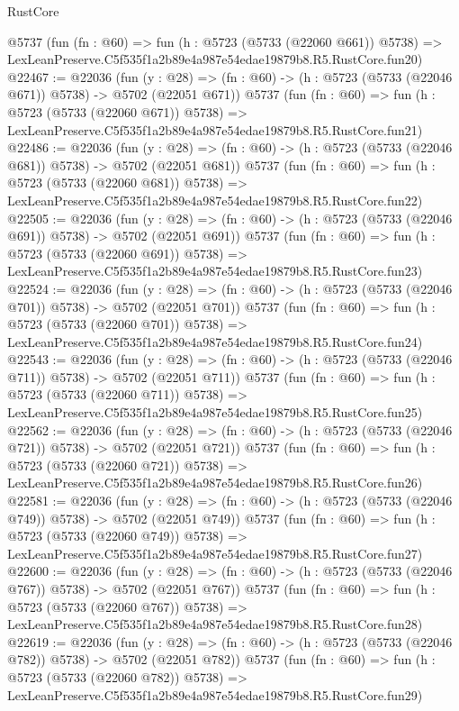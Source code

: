 \begin{lexlean}{RustCore}
\begin{coremodule}
    @5737
    (fun (fn : @60) =>
    fun (h : @5723 (@5733 (@22060 @661)) @5738) =>
    LexLeanPreserve.C5f535f1a2b89e4a987e54edae19879b8.R5.RustCore.fun20)
@22467 := @22036
    (fun (y : @28) => (fn : @60) -> (h : @5723 (@5733 (@22046 @671)) @5738) -> @5702 (@22051 @671))
    @5737
    (fun (fn : @60) =>
    fun (h : @5723 (@5733 (@22060 @671)) @5738) =>
    LexLeanPreserve.C5f535f1a2b89e4a987e54edae19879b8.R5.RustCore.fun21)
@22486 := @22036
    (fun (y : @28) => (fn : @60) -> (h : @5723 (@5733 (@22046 @681)) @5738) -> @5702 (@22051 @681))
    @5737
    (fun (fn : @60) =>
    fun (h : @5723 (@5733 (@22060 @681)) @5738) =>
    LexLeanPreserve.C5f535f1a2b89e4a987e54edae19879b8.R5.RustCore.fun22)
@22505 := @22036
    (fun (y : @28) => (fn : @60) -> (h : @5723 (@5733 (@22046 @691)) @5738) -> @5702 (@22051 @691))
    @5737
    (fun (fn : @60) =>
    fun (h : @5723 (@5733 (@22060 @691)) @5738) =>
    LexLeanPreserve.C5f535f1a2b89e4a987e54edae19879b8.R5.RustCore.fun23)
@22524 := @22036
    (fun (y : @28) => (fn : @60) -> (h : @5723 (@5733 (@22046 @701)) @5738) -> @5702 (@22051 @701))
    @5737
    (fun (fn : @60) =>
    fun (h : @5723 (@5733 (@22060 @701)) @5738) =>
    LexLeanPreserve.C5f535f1a2b89e4a987e54edae19879b8.R5.RustCore.fun24)
@22543 := @22036
    (fun (y : @28) => (fn : @60) -> (h : @5723 (@5733 (@22046 @711)) @5738) -> @5702 (@22051 @711))
    @5737
    (fun (fn : @60) =>
    fun (h : @5723 (@5733 (@22060 @711)) @5738) =>
    LexLeanPreserve.C5f535f1a2b89e4a987e54edae19879b8.R5.RustCore.fun25)
@22562 := @22036
    (fun (y : @28) => (fn : @60) -> (h : @5723 (@5733 (@22046 @721)) @5738) -> @5702 (@22051 @721))
    @5737
    (fun (fn : @60) =>
    fun (h : @5723 (@5733 (@22060 @721)) @5738) =>
    LexLeanPreserve.C5f535f1a2b89e4a987e54edae19879b8.R5.RustCore.fun26)
@22581 := @22036
    (fun (y : @28) => (fn : @60) -> (h : @5723 (@5733 (@22046 @749)) @5738) -> @5702 (@22051 @749))
    @5737
    (fun (fn : @60) =>
    fun (h : @5723 (@5733 (@22060 @749)) @5738) =>
    LexLeanPreserve.C5f535f1a2b89e4a987e54edae19879b8.R5.RustCore.fun27)
@22600 := @22036
    (fun (y : @28) => (fn : @60) -> (h : @5723 (@5733 (@22046 @767)) @5738) -> @5702 (@22051 @767))
    @5737
    (fun (fn : @60) =>
    fun (h : @5723 (@5733 (@22060 @767)) @5738) =>
    LexLeanPreserve.C5f535f1a2b89e4a987e54edae19879b8.R5.RustCore.fun28)
@22619 := @22036
    (fun (y : @28) => (fn : @60) -> (h : @5723 (@5733 (@22046 @782)) @5738) -> @5702 (@22051 @782))
    @5737
    (fun (fn : @60) =>
    fun (h : @5723 (@5733 (@22060 @782)) @5738) =>
    LexLeanPreserve.C5f535f1a2b89e4a987e54edae19879b8.R5.RustCore.fun29)

\end{coremodule}
\end{lexlean}

